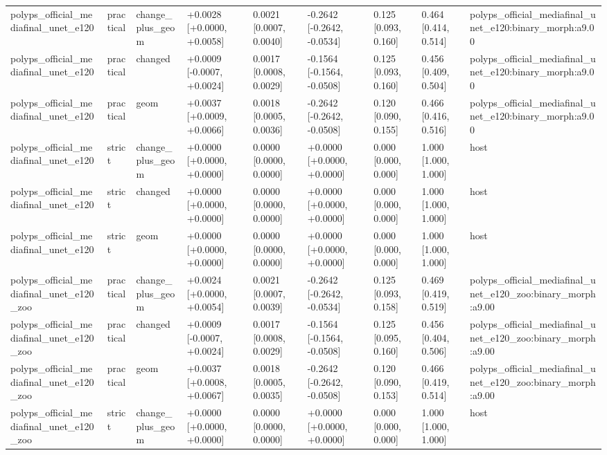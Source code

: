 \begin{table}[t]
\begin{tabular}{lllllllll}
polyps\_official\_mediafinal\_unet\_e120 & practical & change\_plus\_geom & +0.0028 [+0.0000, +0.0058] & 0.0021 [0.0007, 0.0040] & -0.2642 [-0.2642, -0.0534] & 0.125 [0.093, 0.160] & 0.464 [0.414, 0.514] & polyps\_official\_mediafinal\_unet\_e120:binary\_morph:a9.00 \\
polyps\_official\_mediafinal\_unet\_e120 & practical & changed & +0.0009 [-0.0007, +0.0024] & 0.0017 [0.0008, 0.0029] & -0.1564 [-0.1564, -0.0508] & 0.125 [0.093, 0.160] & 0.456 [0.409, 0.504] & polyps\_official\_mediafinal\_unet\_e120:binary\_morph:a9.00 \\
polyps\_official\_mediafinal\_unet\_e120 & practical & geom & +0.0037 [+0.0009, +0.0066] & 0.0018 [0.0005, 0.0036] & -0.2642 [-0.2642, -0.0508] & 0.120 [0.090, 0.155] & 0.466 [0.416, 0.516] & polyps\_official\_mediafinal\_unet\_e120:binary\_morph:a9.00 \\
polyps\_official\_mediafinal\_unet\_e120 & strict & change\_plus\_geom & +0.0000 [+0.0000, +0.0000] & 0.0000 [0.0000, 0.0000] & +0.0000 [+0.0000, +0.0000] & 0.000 [0.000, 0.000] & 1.000 [1.000, 1.000] & host \\
polyps\_official\_mediafinal\_unet\_e120 & strict & changed & +0.0000 [+0.0000, +0.0000] & 0.0000 [0.0000, 0.0000] & +0.0000 [+0.0000, +0.0000] & 0.000 [0.000, 0.000] & 1.000 [1.000, 1.000] & host \\
polyps\_official\_mediafinal\_unet\_e120 & strict & geom & +0.0000 [+0.0000, +0.0000] & 0.0000 [0.0000, 0.0000] & +0.0000 [+0.0000, +0.0000] & 0.000 [0.000, 0.000] & 1.000 [1.000, 1.000] & host \\
polyps\_official\_mediafinal\_unet\_e120\_zoo & practical & change\_plus\_geom & +0.0024 [+0.0000, +0.0054] & 0.0021 [0.0007, 0.0039] & -0.2642 [-0.2642, -0.0534] & 0.125 [0.093, 0.158] & 0.469 [0.419, 0.519] & polyps\_official\_mediafinal\_unet\_e120\_zoo:binary\_morph:a9.00 \\
polyps\_official\_mediafinal\_unet\_e120\_zoo & practical & changed & +0.0009 [-0.0007, +0.0024] & 0.0017 [0.0008, 0.0029] & -0.1564 [-0.1564, -0.0508] & 0.125 [0.095, 0.160] & 0.456 [0.404, 0.506] & polyps\_official\_mediafinal\_unet\_e120\_zoo:binary\_morph:a9.00 \\
polyps\_official\_mediafinal\_unet\_e120\_zoo & practical & geom & +0.0037 [+0.0008, +0.0067] & 0.0018 [0.0005, 0.0035] & -0.2642 [-0.2642, -0.0508] & 0.120 [0.090, 0.153] & 0.466 [0.419, 0.514] & polyps\_official\_mediafinal\_unet\_e120\_zoo:binary\_morph:a9.00 \\
polyps\_official\_mediafinal\_unet\_e120\_zoo & strict & change\_plus\_geom & +0.0000 [+0.0000, +0.0000] & 0.0000 [0.0000, 0.0000] & +0.0000 [+0.0000, +0.0000] & 0.000 [0.000, 0.000] & 1.000 [1.000, 1.000] & host \\

\end{tabular}
\end{table}
